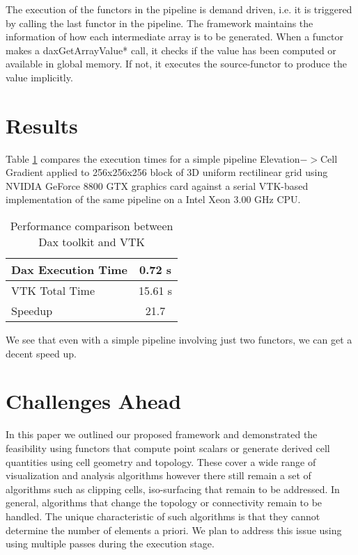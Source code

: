 \documentclass{vgtc}                          %
\begin{document}
The execution of the functors in the pipeline is demand driven, i.e. it is
triggered by calling the last functor in the pipeline. The framework maintains
the information of how each intermediate array is to be generated. When a
functor makes a daxGetArrayValue* call, it checks if the value has been computed
or available in global memory. If not, it executes the source-functor to produce
the value implicitly.

\section{Results}
\label{sec:Results}

Table \ref{tab:Results} compares the execution times for a simple pipeline
Elevation$->$Cell Gradient applied to 256x256x256 block of 3D uniform
rectilinear grid using NVIDIA GeForce 8800 GTX graphics card against a serial VTK-based
implementation of the same pipeline on a Intel Xeon 3.00 GHz CPU.

\begin{table}[htbp]
  \centering
  \label{tab:Results}
  \begin{tabular}{|l||c|}
    \hline
    Dax Execution Time & 0.72 s \\
    \hline
    VTK Total Time & 15.61 s \\
    \hline
    \hline
    Speedup & 21.7 \\
    \hline
  \end{tabular}
  \caption{Performance comparison between Dax toolkit and VTK}
\end{table}

We see that even with a simple pipeline involving just two functors, we can
get a decent speed up.

\section{Challenges Ahead}
\label{sec:Challenges}

In this paper we outlined our proposed framework and demonstrated the
feasibility using functors that compute point scalars or generate derived cell
quantities using cell geometry and topology. These cover a wide range of
visualization and analysis algorithms however there still remain a set of
algorithms such as clipping cells, iso-surfacing that remain to be addressed. In
general, algorithms that change the topology or connectivity remain to be
handled. The unique characteristic of such algorithms is that they cannot determine the
number of elements a priori. We plan to address this issue using using multiple
passes during the execution stage.
\end{document}
